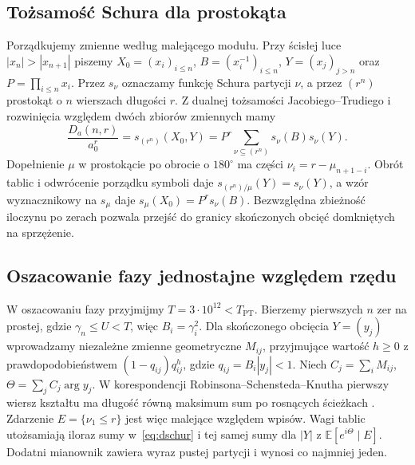 \documentclass[11pt,a4paper,reqno]{amsart}
\numberwithin{equation}{section}
\begin{document}
\subsection{Tożsamość Schura dla prostokąta}
Porządkujemy zmienne według malejącego modułu. Przy ścisłej luce \(|x_n|>|x_{n+1}|\) piszemy \(X_0=(x_i)_{i\le n}\), \(B=(x_i^{-1})_{i\le n}\), \(Y=(x_j)_{j>n}\) oraz \(P=\prod_{i\le n}x_i\). Przez \(s_\nu\) oznaczamy funkcję Schura partycji \(\nu\), a przez \((r^n)\) prostokąt o \(n\) wierszach długości \(r\). Z dualnej tożsamości Jacobiego--Trudiego i rozwinięcia względem dwóch zbiorów zmiennych mamy \cite[rozdz.~I, \S\S3,5]{mac}
\begin{equation}\label{eq:dschur}
 \frac{D_a(n,r)}{a_0^r}=s_{(r^n)}(X_0,Y)
   =P^r\sum_{\nu\subseteq(r^n)}s_\nu(B)s_\nu(Y).
\end{equation}
Dopełnienie \(\mu\) w prostokącie po obrocie o \(180^\circ\) ma części \(\nu_i=r-\mu_{n+1-i}\). Obrót tablic i odwrócenie porządku symboli daje \(s_{(r^n)/\mu}(Y)=s_\nu(Y)\), a wzór wyznacznikowy na \(s_\mu\) daje \(s_\mu(X_0)=P^rs_\nu(B)\). Bezwzględna zbieżność iloczynu po zerach pozwala przejść do granicy skończonych obcięć domkniętych na sprzężenie.

\subsection{Oszacowanie fazy jednostajne względem rzędu}\label{sec:phase}
W oszacowaniu fazy przyjmijmy \(T=3\cdot10^{12}<T_{\mathrm{PT}}\). Bierzemy pierwszych \(n\) zer na prostej, gdzie \(\gamma_n\le U<T\), więc \(B_i=\gamma_i^2\). Dla skończonego obcięcia \(Y=(y_j)\) wprowadzamy niezależne zmienne geometryczne \(M_{ij}\), przyjmujące wartość \(h\ge0\) z prawdopodobieństwem \((1-q_{ij})q_{ij}^h\), gdzie \(q_{ij}=B_i|y_j|<1\). Niech \(C_j=\sum_i M_{ij}\), \(\Theta=\sum_j C_j\arg y_j\). W korespondencji Robinsona--Schensteda--Knutha pierwszy wiersz kształtu ma długość równą maksimum sum po rosnących ścieżkach \cite[\S2.1]{joh}. Zdarzenie \(E=\{\nu_1\le r\}\) jest więc malejące względem wpisów. Wagi tablic utożsamiają iloraz sumy w~\eqref{eq:dschur} i tej samej sumy dla \(|Y|\) z \(\mathbb E[e^{i\Theta}\mid E]\). Dodatni mianownik zawiera wyraz pustej partycji i wynosi co najmniej jeden.
\end{document}
